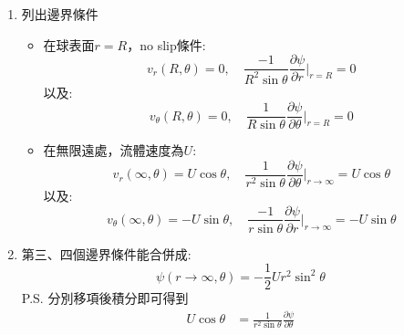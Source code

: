 \documentclass[../main.tex]{subfiles}
\begin{document}
\begin{itemize}
\begin{enumerate}
    但是把$\psi$代入會非常複雜\\
    若從旋度的角度切入可將上式改寫為:
    \begin{equation}
      E^4 \psi = 0
    \end{equation}
    其中$E^2$為:
    \begin{equation}
      \boxed{E^2 = \frac{\partial^2}{\partial r^2} + \frac{\sin\theta}{r^2}\frac{\partial}{\partial \theta}\left(
        \frac{1}{\sin\theta}\frac{\partial}{\partial \theta}
      \right)}
    \end{equation}
    \item 列出邊界條件
    \begin{itemize}
      \item 在球表面$r=R$，no slip條件:
      \begin{equation}
        v_r(R,\theta) = 0,\quad \frac{-1}{R^2\sin\theta}\frac{\partial \psi}{\partial r}\bigg|_{r=R} = 0 \label{eq:ch2_3_stokes_sphere_bc1}
      \end{equation}
      以及:
      \begin{equation}
        v_\theta(R,\theta) = 0,\quad \frac{1}{R\sin\theta}\frac{\partial \psi}{\partial \theta}\bigg|_{r=R} = 0 \label{eq:ch2_3_stokes_sphere_bc2}
      \end{equation}
      \item 在無限遠處，流體速度為$U$:
      \begin{equation}
        v_r(\infty,\theta) = U \cos\theta,\quad \frac{1}{r^2\sin\theta}\frac{\partial \psi}{\partial \theta}\bigg|_{r\to\infty} = U \cos\theta \label{eq:ch2_3_stokes_sphere_bc3}
      \end{equation}
      以及:
      \begin{equation}
        v_\theta(\infty,\theta) = -U \sin\theta,\quad \frac{-1}{r\sin\theta}\frac{\partial \psi}{\partial r}\bigg|_{r\to\infty} = -U \sin\theta \label{eq:ch2_3_stokes_sphere_bc4}
      \end{equation}
    \end{itemize}
    \item 第三、四個邊界條件能合併成:
    \begin{equation}
      \psi(r\to\infty,\theta) = -\frac{1}{2} U r^2 \sin^2\theta \label{eq:ch2_3_stokes_sphere_bc34}
    \end{equation}
    P.S. 分別移項後積分即可得到
    \begin{align}
      U \cos\theta &= \frac{1}{r^2\sin\theta}\frac{\partial \psi}{\partial \theta} \nonumber\\

\end{align}
\end{enumerate}
\end{itemize}
\end{document}
